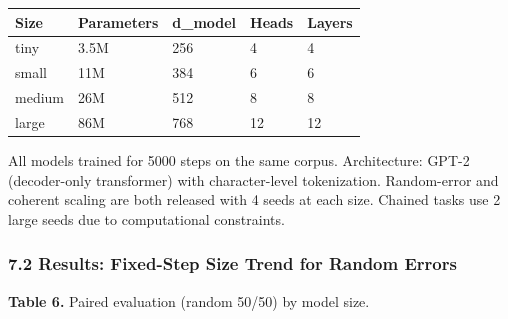 \documentclass[
  11pt,
]{article}
\newcounter{none} %
\begin{document}
{\def\LTcaptype{none} %
\begin{longtable}[]{@{}lllll@{}}
\toprule\noalign{}
Size & Parameters & d\_model & Heads & Layers \\
\midrule\noalign{}
\endhead
\bottomrule\noalign{}
\endlastfoot
tiny & 3.5M & 256 & 4 & 4 \\
small & 11M & 384 & 6 & 6 \\
medium & 26M & 512 & 8 & 8 \\
large & 86M & 768 & 12 & 12 \\
\end{longtable}
}

All models trained for 5000 steps on the same corpus. Architecture:
GPT-2 (decoder-only transformer) with character-level tokenization.
Random-error and coherent scaling are both released with 4 seeds at each
size. Chained tasks use 2 large seeds due to computational constraints.

\subsubsection{7.2 Results: Fixed-Step Size Trend for Random
Errors}\label{results-fixed-step-size-trend-for-random-errors}

\textbf{Table 6.} Paired evaluation (random 50/50) by model size.
\end{document}
